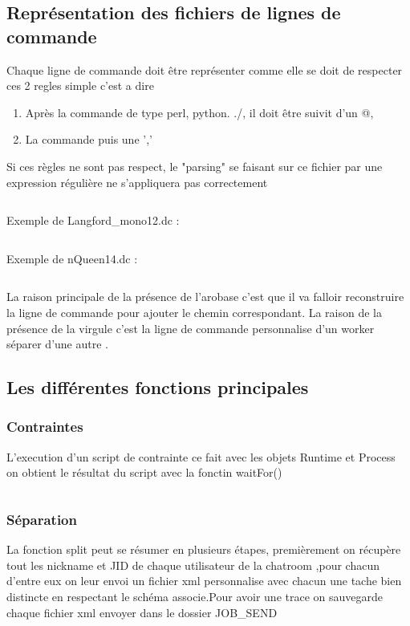 \documentclass[11pt]{article}
\begin{document}
\subsection{Représentation des fichiers de lignes de commande} 
Chaque ligne de commande doit être représenter comme elle se doit de respecter ces 2 regles simple 
c'est a dire 
\begin{enumerate}
\item Après la commande de type perl, python. ./, il doit être suivit d'un @,  
\item La commande puis une ','
\end{enumerate}
Si ces règles ne sont pas respect, le "parsing" se faisant sur ce fichier par une expression régulière ne s\textquoteright appliquera pas correctement  
\inputminted{perl}{../Echantillon_Script_Cmd/Toto.dc}
Exemple de Langford\_mono12.dc :
\inputminted{perl}{../Echantillon_Script_Cmd/Langford_mono12.dc}
Exemple de nQueen14.dc :
\inputminted{perl}{../Echantillon_Script_Cmd/nQuenn14.dc}

La raison principale de la présence de l'arobase c'est que il va falloir reconstruire la ligne de commande pour ajouter le chemin correspondant.
La raison de la présence de la virgule c'est la ligne de commande personnalise d'un worker séparer d'une autre .
\newpage
\subsection{Les différentes fonctions principales}

\subsubsection{Contraintes} 
L'execution d'un script de contrainte ce fait avec les objets Runtime et Process on obtient le résultat du script avec la fonctin waitFor() 
\inputminted{perl}{../Echantillon_Script_Perl/OSname.pl}
\newpage
\subsubsection{Séparation} 
La fonction split peut se résumer en plusieurs étapes, premièrement on récupère tout les nickname et JID de chaque utilisateur de la chatroom ,pour chacun d'entre eux on leur envoi un fichier xml personnalise avec chacun une tache bien distincte en respectant le schéma associe.Pour avoir une trace on sauvegarde chaque fichier xml envoyer dans le dossier JOB\_SEND
\inputminted[tabsize=2,frame=lines,linenos]{java}{Fichier_import/split.java}
\end{document}
